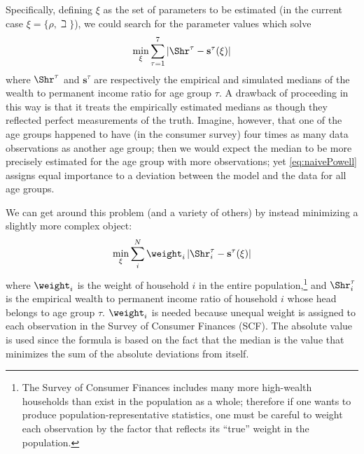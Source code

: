 Specifically, defining $\xi$ as the set of parameters
to be estimated (in the current case $\xi =\{\rho ,{\beth}\}$), we could search for
the parameter values which solve
  \begin{equation}
    \begin{gathered}
      \begin{aligned}
        \min_{\xi} \sum_{\tau=1}^{7} |\Shr^{\tau} -\mathbf{s}^{\tau}(\xi)|  \label{eq:naivePowell}
      \end{aligned}
    \end{gathered}
  \end{equation}
where $\Shr^{\tau }$ and $\mathbf{s}^{\tau}$ are respectively the empirical
and simulated medians of the wealth to permanent income ratio for age group $\tau$.
A drawback of proceeding in this way is that it treats the empirically
estimated medians as though they reflected perfect measurements of the
truth. Imagine, however, that one of the age groups happened to have
(in the consumer survey) four times as many data observations as
another age group; then we would expect the median to be more
precisely estimated for the age group with more observations; yet
\eqref{eq:naivePowell} assigns equal importance to a deviation between
the model and the data for all age groups.

We can get around this problem (and a variety of others) by instead minimizing a slightly more complex object:
  \begin{equation}
    \min_{\xi}\sum_{i}^{N}\weight _{i}\left|\Shr_{i}^{\tau }-\mathbf{s}^{\tau}(\xi )\right|\label{eq:StructEstim}
  \end{equation}
where $\weight_{i}$ is the weight of household $i$ in the entire
population,\footnote{The Survey of Consumer Finances includes many
  more high-wealth households than exist in the population as a whole;
  therefore if one wants to produce population-representative
  statistics, one must be careful to weight each observation by the
  factor that reflects its ``true'' weight in the population.} and
$\Shr_{i}^{\tau }$ is the empirical wealth to permanent income
ratio of household $i$ whose head belongs to age group
$\tau$. $\weight _{i}$ is needed because unequal weight is assigned to
each observation in the Survey of Consumer Finances (SCF). The
absolute value is used since the formula is based on the fact that the
median is the value that minimizes the sum of the absolute deviations
from itself.


